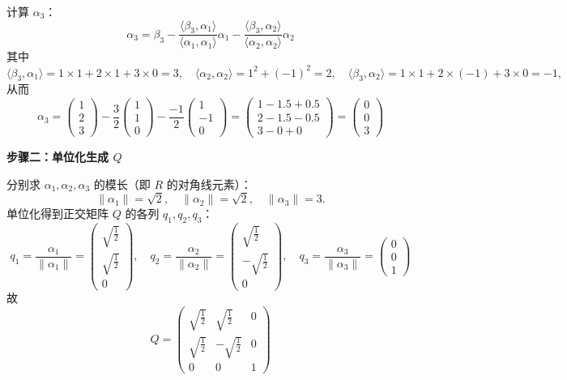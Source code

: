 \begin{enumerate}
计算 $\alpha_3$：
\[\alpha_3=\beta_3-\frac{\langle\beta_3,\alpha_1\rangle}{\langle\alpha_1,\alpha_1\rangle}\alpha_1
-\frac{\langle\beta_3,\alpha_2\rangle}{\langle\alpha_2,\alpha_2\rangle}\alpha_2\]
其中
\[\langle\beta_3,\alpha_1\rangle=1\times1+2\times1+3\times0=3,
\quad\langle\alpha_2,\alpha_2\rangle=1^2+(-1)^2=2,
\quad\langle\beta_3,\alpha_2\rangle=1\times1+2\times(-1)+3\times0=-1,\]
从而
\[\alpha_3=
\begin{pmatrix}1\\2\\3\end{pmatrix}
-\frac{3}{2}
\begin{pmatrix}1\\1\\0\end{pmatrix}
-\frac{-1}{2}
\begin{pmatrix}1\\-1\\0\end{pmatrix}
=
\begin{pmatrix}1-1.5+0.5\\2-1.5-0.5\\3-0+0\end{pmatrix}
=
\begin{pmatrix}0\\0\\3\end{pmatrix}\]

\textbf{步骤二：单位化生成 $Q$}

分别求 $\alpha_1,\alpha_2,\alpha_3$ 的模长（即 $R$ 的对角线元素）：
\[\|\alpha_1\|=\sqrt2,\quad \|\alpha_2\|=\sqrt2,\quad \|\alpha_3\|=3.\]
单位化得到正交矩阵 $Q$ 的各列 $q_1,q_2,q_3$：
\[q_1=\frac{\alpha_1}{\|\alpha_1\|}=
\begin{pmatrix}\sqrt{\tfrac12}\\ \sqrt{\tfrac12}\\ 0\end{pmatrix},
\quad
q_2=\frac{\alpha_2}{\|\alpha_2\|}=
\begin{pmatrix}\sqrt{\tfrac12}\\ -\sqrt{\tfrac12}\\ 0\end{pmatrix},
\quad
q_3=\frac{\alpha_3}{\|\alpha_3\|}=
\begin{pmatrix}0\\0\\1\end{pmatrix}\]
故
\[Q=
\begin{pmatrix}
\sqrt{\tfrac12} & \sqrt{\tfrac12} & 0 \\
\sqrt{\tfrac12} & -\sqrt{\tfrac12} & 0 \\
0 & 0 & 1
\end{pmatrix}\]


\end{enumerate}
